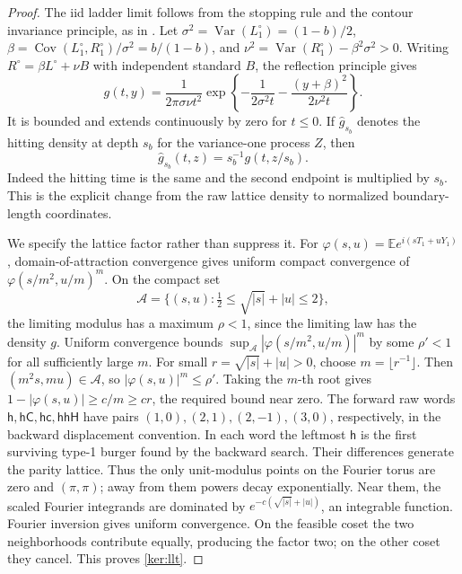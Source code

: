 \documentclass[11pt]{article}
\numberwithin{equation}{section}
\theoremstyle{definition}
\theoremstyle{remark}
\newcommand{\EE}{\mathbb E}
\newcommand{\1}{\mathbf 1}
\begin{document}
\begin{proof}
The iid ladder limit follows from the stopping rule and the contour
invariance principle, as in \cite[Section~2.1]{GwynneSunFKII}.
Let \(\sigma^2=\operatorname{Var}(L_1^\circ)=(1-b)/2\),
\(\beta=\operatorname{Cov}(L_1^\circ,R_1^\circ)/\sigma^2=b/(1-b)\),
and \(\nu^2=\operatorname{Var}(R_1^\circ)-\beta^2\sigma^2>0\).
Writing \(R^\circ=\beta L^\circ+\nu B\) with independent standard
\(B\), the
reflection principle gives
\begin{equation}
 g(t,y)=\frac{1}{2\pi\sigma\nu t^2}
  \exp\!\left\{-\frac{1}{2\sigma^2t}
              -\frac{(y+\beta)^2}{2\nu^2t}\right\}.
 \label{ker:hit-density}
\end{equation}
It is bounded and extends continuously by zero for \(t\le0\).
If \(\widehat g_{s_b}\) denotes the hitting density at depth \(s_b\)
for the variance-one process \(Z\), then
\begin{equation}\label{ker:hitting-units}
 \widehat g_{s_b}(t,z)=s_b^{-1}g(t,z/s_b).
\end{equation}
Indeed the hitting time is the same and the second endpoint is
multiplied by \(s_b\).  This is the explicit change from the raw
lattice density to normalized boundary-length coordinates.

We specify the lattice factor rather than suppress it.
For \(\varphi(s,u)=\EE e^{i(sT_1+uY_1)}\), domain-of-attraction
convergence gives uniform compact convergence of
\(\varphi(s/m^2,u/m)^m\).
On the compact set
\[
 \mathcal A=\{(s,u):\tfrac12\le\sqrt{|s|}+|u|\le2\},
\]
the limiting modulus has a maximum \(\rho<1\), since the limiting
law has the density \(g\).  Uniform convergence bounds
\(\sup_{\mathcal A}|\varphi(s/m^2,u/m)|^m\) by some
\(\rho'<1\) for all sufficiently large \(m\).
For small \(r=\sqrt{|s|}+|u|>0\), choose \(m=\lfloor r^{-1}\rfloor\).
Then \((m^2s,mu)\in\mathcal A\), so
\(|\varphi(s,u)|^m\le\rho'\).  Taking the \(m\)-th root gives
\(1-|\varphi(s,u)|\ge c/m\ge cr\), the required bound near zero.
The forward raw words
\(\mathsf h,\mathsf h\mathsf C,\mathsf h\mathsf c,
\mathsf h\mathsf h\mathsf H\)
have pairs \((1,0),(2,1),(2,-1),(3,0)\), respectively, in the
backward displacement convention.  In each word the leftmost
\(\mathsf h\) is the first surviving type-1 burger found by the
backward search.
Their differences generate the parity lattice.  Thus the only
unit-modulus points on the Fourier torus are zero and \((\pi,\pi)\);
away from them powers decay exponentially.  Near them, the scaled
Fourier integrands are dominated by
\(e^{-c(\sqrt{|s|}+|u|)}\), an integrable function.
Fourier inversion gives uniform convergence.  On the feasible coset
the two neighborhoods contribute equally, producing the factor two;
on the other coset they cancel.  This proves \eqref{ker:llt}.


\end{proof}
\end{document}
